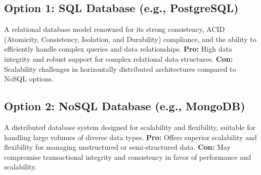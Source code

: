 \subsection*{Option 1: SQL Database (e.g., PostgreSQL)}
A relational database model renowned for its strong consistency, ACID (Atomicity, Consistency, Isolation, and Durability) compliance, and the ability to efficiently handle complex queries and data relationships.
\textbf{Pro:} High data integrity and robust support for complex relational data structures.
\textbf{Con:} Scalability challenges in horizontally distributed architectures compared to NoSQL options.

\subsection*{Option 2: NoSQL Database (e.g., MongoDB)}
A distributed database system designed for scalability and flexibility, suitable for handling large volumes of diverse data types.
\textbf{Pro:} Offers superior scalability and flexibility for managing unstructured or semi-structured data.
\textbf{Con:} May compromise transactional integrity and consistency in favor of performance and scalability.



